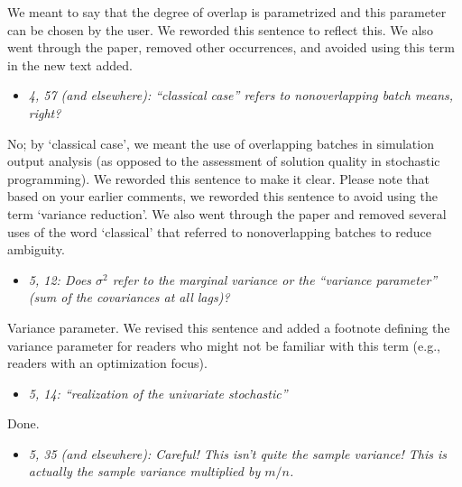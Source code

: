 \documentclass[11pt,notitlepage,onecolumn]{article}
\newcommand{\noi}{\noindent}
\begin{document}
\noi
We meant to say that the degree of overlap is parametrized and this parameter can be chosen by the user. 
We reworded this sentence to reflect this. 
We also went through the paper, removed other occurrences, and avoided using this term in the new text added. 
\medskip 



\begin{itemize}
\item[] \textit{4, 57 (and elsewhere): ``classical case'' refers to nonoverlapping batch means, right?}
\end{itemize}

\noi
No; by `classical case', we meant the use of overlapping batches in simulation output analysis (as opposed to the assessment of solution quality in stochastic programming). 
We reworded this sentence to make it clear. 
Please note that based on your earlier comments, we reworded this sentence to avoid using the term `variance reduction'. 
We also went through the paper and removed several uses of the word `classical' that referred to nonoverlapping batches to reduce ambiguity.
\medskip 



\begin{itemize}
\item[] \textit{5, 12: Does $\sigma^2$ refer to the marginal variance or the ``variance parameter'' (sum of the covariances at all lags)?}
\end{itemize}

\noi
Variance parameter. 
We revised this sentence and added a footnote defining the variance parameter for readers who might not be familiar with this term (e.g., readers with an optimization focus). 
\medskip 



\begin{itemize}
\item[] \textit{5, 14: ``realization of the univariate stochastic''}
\end{itemize}

\noi
Done.  
\medskip 


\begin{itemize}
\item[] \textit{5, 35 (and elsewhere): Careful! This isn't quite the sample variance! This is actually the sample variance multiplied by $m/n$.}
\end{itemize}
\end{document}
